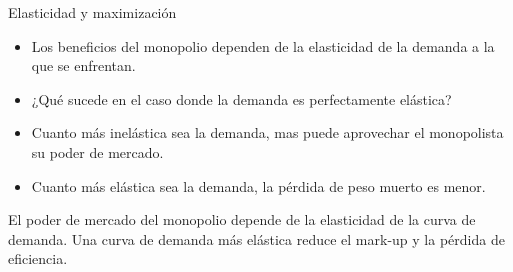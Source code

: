 \documentclass{beamer}
\begin{document}
\begin{frame}{Elasticidad y maximización}
    \begin{itemize}
        \item Los beneficios del monopolio dependen de la elasticidad de la demanda a la que se enfrentan.
        \item ¿Qué sucede en el caso donde la demanda es perfectamente elástica?
        \item Cuanto más inelástica sea la demanda, mas puede aprovechar el monopolista su poder de mercado.
        \item Cuanto más elástica sea la demanda, la pérdida de peso muerto es menor.
    \end{itemize}
    \begin{boxA}
        El poder de mercado del monopolio depende de la elasticidad de
        la curva de demanda. Una curva de demanda más elástica reduce
        el mark-up y la pérdida de eficiencia.

    \end{boxA}
\end{frame}
\end{document}
